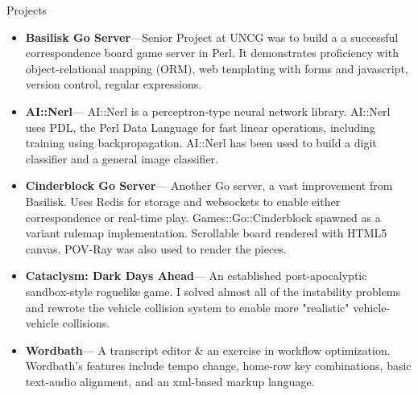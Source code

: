 \documentclass[11pt,oneside]{article}
\newenvironment{ressection}[1]{
	\vspace{2pt}
	{\fontfamily{phv}\selectfont\Large#1}
	\begin{itemize}
	\vspace{3pt}
}{
	\end{itemize}
}
\newcommand{\resitem}[1]{
	\vspace{-4pt}
	\item \begin{flushleft} #1 \end{flushleft}
}
\newcommand{\ressubitem}[1]{
	\vspace{-1pt}
	\item \begin{flushleft} #1 \end{flushleft}
}
\begin{document}





\newcommand{\resproj}[2]{
  \vspace{-5pt}
  \item
  \textbf{#1}---#2 \\
}

\begin{ressection}{Projects}

	\resproj{Basilisk Go Server}{Senior Project at UNCG was to build a a successful correspondence
         board game server in Perl. It demonstrates proficiency with object-relational mapping (ORM),
         web templating with forms and javascript, version control, regular expressions.}
	\resproj{AI::Nerl}{
      AI::Nerl is a perceptron-type neural network library. AI::Nerl uses PDL, the Perl Data
      Language for fast linear operations, including training using backpropagation.
      AI::Nerl has been used to build a digit classifier and a general image classifier.
      }
	\resproj{Cinderblock Go Server}{
      Another Go server, a vast improvement from Basilisk. Uses Redis for storage and websockets
      to enable either correspondence or real-time play. Games::Go::Cinderblock spawned as a
      variant rulemap implementation. Scrollable board rendered with HTML5 canvas.
      POV-Ray was also used to render the pieces.
      }
	\resproj{Cataclysm: Dark Days Ahead}{
    An established post-apocalyptic sandbox-style roguelike game. I solved almost all of the
    instability problems and rewrote the vehicle collision system to enable more "realistic"
    vehicle-vehicle collisions.
  }
  \resproj{Wordbath}{
    A transcript editor \& an exercise in workflow optimization.
    Wordbath's features include tempo change, home-row key combinations,
    basic text-audio alignment, and an xml-based markup language.
  }
\end{ressection}
\end{document}
